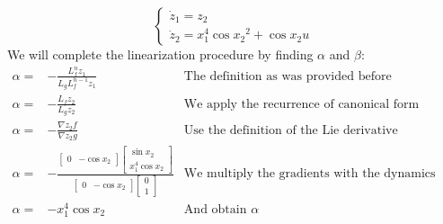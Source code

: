 {\begin{equation}
            \begin{cases}
                \dot{z}_1 = z_2\\
                \dot{z}_2 = x_1^{4}\cos{x_2}^{2} + \cos{x_2}u
            \end{cases}
        \end{equation}
        We will complete the linearization procedure by finding $\alpha$ and  $\beta$:
         \begin{equation}
             \begin{aligned}
                 \alpha=&-\frac{L_f^{n}z_1}{L_gL_f^{n-1}z_1}&\mbox{The definition as was provided before}\\[1.25ex]
                 \alpha=&-\frac{L_fz_2}{L_gz_2}&\mbox{We apply the recurrence of canonical form}\\[1.25ex]
                 \alpha=&-\frac{\nabla z_2 f}{\nabla z_2 g}&\mbox{Use the definition of the Lie derivative}\\[1.25ex]
                 \alpha=&-\frac{\begin{bmatrix}
                         0 & -\cos{x_2}
                 \end{bmatrix} \begin{bmatrix}
                 \sin{x_2} \\ x_1^{4}\cos{x_2}
                 \end{bmatrix}}{\begin{bmatrix}
                         0 & -\cos{x_2}
                 \end{bmatrix}\begin{bmatrix}
                      0 \\ 1
                 \end{bmatrix}}&\mbox{We multiply the gradients with the dynamics functions}\\[1.25ex]
                         \alpha=&-x_1^{4}\cos{x_2}&\mbox{And obtain $\alpha$}\\[1.25ex]
                 
                 
                 

\end{aligned}
\end{equation}}
